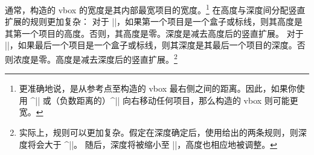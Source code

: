 通常，构造的 vbox 的宽度是其内部最宽项目的宽度。\footnote{更准确地说，是从参考点至构造的 vbox 最右侧之间的距离。因此，如果你使用 ^|\moveright| 或（负数距离的）^|\moveleft| 向右移动任何项目，那么构造的 vbox 则可能更宽。}
在高度与深度间分配竖直扩展的规则更加复杂：
\ulist
\li 对于 |\vtop|，如果第一个项目是一个盒子或标线，则其高度是其第一个项目的高度。否则，其高度是零。深度是减去高度后的竖直扩展。
\li 对于 |\vbox|，如果最后一个项目是一个盒子或标线，则其深度是其最后一个项目的深度。否则浓度是零。高度是减去深度后的竖直扩展。\footnote{实际上，规则可以更加复杂。假定在深度确定后，使用给出的两条规则，则深度将会大于 ^|\boxmaxdepth|。 随后，深度将被缩小至 |\boxmaxdepth|，高度也相应地被调整。}
\endulist

